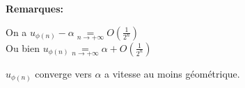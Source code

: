 \documentclass[12pt,twoside,a4paper]{article}
\begin{document}
		\begin{flushleft}
			\textbf{Remarques:}\\
			\begin{liste}
				\item On a $u_{\phi(n)}-\alpha \mathop{=}\limits_{n\rightarrow+\infty}O\left(\frac{1}{2^n}\right)$\\
					Ou bien $u_{\phi(n)} \mathop{=}\limits_{n\rightarrow+\infty}\alpha+O\left(\frac{1}{2^n}\right)$
				\item $u_{\phi(n)}$ converge vers $\alpha$ a vitesse au moins g\'eom\'etrique.
			\end{liste}
		\end{flushleft}
\end{document}
